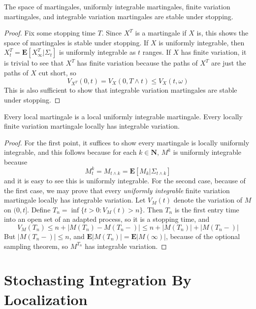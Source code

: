 \begin{theorem}
    The space of martingales, uniformly integrable martingales, finite variation martingales, and integrable variation martingales are stable under stopping.
\end{theorem}
\begin{proof}
    Fix some stopping time $T$. Since $X^T$ is a martingale if $X$ is, this shows the space of martingales is stable under stopping. If $X$ is uniformly integrable, then $X^T_t = \mathbf{E}[X^T_\infty|\Sigma_t]$ is uniformly integrable as $t$ ranges. If $X$ has finite variation, it is trivial to see that $X^T$ has finite variation because the paths of $X^T$ are just the paths of $X$ cut short, so
    \[ V_{X^T}(0,t) = V_X(0, T \wedge t) \leq V_X(t,\omega) \]
    This is also sufficient to show that integrable variation martingales are stable under stopping.
\end{proof}

\begin{lemma}
    Every local martingale is a local uniformly integrable martingale. Every locally finite variation martingale locally has integrable variation.
\end{lemma}
\begin{proof}
    For the first point, it suffices to show every martingale is locally uniformly integrable, and this follows because for each $k \in \mathbf{N}$, $M^k$ is uniformly integrable because
    \[ M^k_t = M_{t \wedge k} = \mathbf{E}[M_k|\Sigma_{t \wedge k}] \]
    and it is easy to see this is uniformly integrable. For the second case, because of the first case, we may prove that every {\it uniformly integrable} finite variation martingale locally has integrable variation. Let $V_M(t)$ denote the variation of $M$ on $(0,t]$. Define $T_n = \inf \{ t > 0 : V_M(t) > n \}$. Then $T_n$ is the first entry time into an open set of an adapted process, so it is a stopping time, and
    \[ V_M(T_n) \leq n + |M(T_n) - M(T_n-)| \leq n + |M(T_n)| + |M(T_n-)| \]
    But $|M(T_n-)| \leq n$, and $\mathbf{E} |M(T_n)| = \mathbf{E} |M(\infty)|$, because of the optional sampling theorem, so $M^{T_n}$ has integrable variation.
\end{proof}

\section{Stochasting Integration By Localization}

